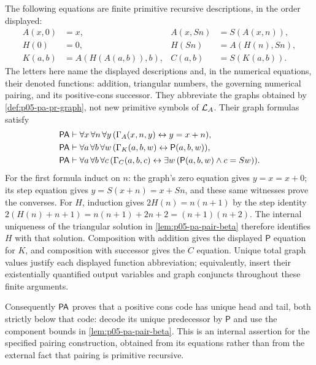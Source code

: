 \begin{example}
\label{ex:p05-pa-pair-cons-graphs}
The following equations are finite primitive recursive descriptions, in the
order displayed:
\[
\begin{aligned}
 A(x,0)&=x,& A(x,Sn)&=S(A(x,n)),\\
 H(0)&=0,& H(Sn)&=A(H(n),Sn),\\
 K(a,b)&=A(H(A(a,b)),b),& C(a,b)&=S(K(a,b)).
\end{aligned}
\]
The letters here name the displayed descriptions and, in the numerical
equations, their denoted functions: addition, triangular numbers,
the governing numerical pairing, and its positive-cons successor.  They
abbreviate the graphs obtained by \cref{def:p05-pa-pr-graph}, not new
primitive symbols of \(\mathcal{L}_A\).  Their graph formulas satisfy
\[
\begin{aligned}
 \mathsf{PA}&\vdash\forall x\,\forall n\,\forall y\,
            (\Gamma_A(x,n,y)\leftrightarrow y=x+n),\\
 \mathsf{PA}&\vdash\forall a\,\forall b\,\forall w\,
            (\Gamma_K(a,b,w)\leftrightarrow\mathsf P(a,b,w)),\\
 \mathsf{PA}&\vdash\forall a\,\forall b\,\forall c\,
   (\Gamma_C(a,b,c)\leftrightarrow
          \exists w\,(\mathsf P(a,b,w)\land c=Sw)).
\end{aligned}
\]
For the first formula induct on \(n\): the graph's zero equation gives
\(y=x=x+0\); its step equation gives \(y=S(x+n)=x+Sn\), and these
same witnesses prove the converses.  For \(H\), induction gives
\(2H(n)=n(n+1)\) by the step identity
\(2(H(n)+n+1)=n(n+1)+2n+2=(n+1)(n+2)\).
The internal uniqueness of the triangular solution in
\cref{lem:p05-pa-pair-beta} therefore identifies \(H\) with that solution.
Composition with addition gives the displayed \(\mathsf P\) equation
for \(K\), and composition with successor gives the \(C\) equation.
Unique total graph values justify each displayed function abbreviation;
equivalently, insert their existentially quantified output variables and
graph conjuncts throughout these finite arguments.

Consequently \(\mathsf{PA}\) proves that a positive cons code has unique head
and tail, both strictly below that code: decode its unique predecessor by
\(\mathsf P\) and use the component bounds in
\cref{lem:p05-pa-pair-beta}.  This is an internal assertion for the specified
pairing construction, obtained from its equations rather than from the
external fact that pairing is primitive recursive.
\end{example}

